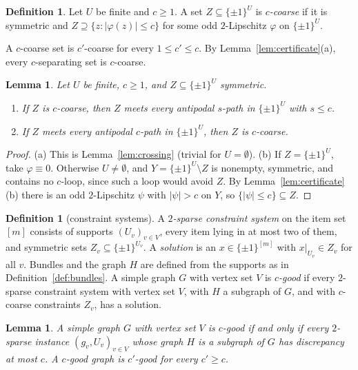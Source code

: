 \documentclass[11pt,letterpaper]{article}
\newtheorem{lemma}[theorem]{Lemma}
\theoremstyle{definition}
\newtheorem{definition}[theorem]{Definition}
\newcommand{\cube}[1]{\{\pm1\}^{#1}}
\begin{document}
\begin{definition}\label{def:coarse}
Let $U$ be finite and $c\ge1$. A set $Z\subseteq\cube U$ is \emph{$c$-coarse} if it is symmetric
and $Z\supseteq\{z:|\varphi(z)|\le c\}$ for some odd $2$-Lipschitz $\varphi$ on $\cube U$.
\end{definition}

A $c$-coarse set is $c'$-coarse for every $1\le c'\le c$. By Lemma~\ref{lem:certificate}(a), every
$c$-separating set is $c$-coarse.

\begin{lemma}\label{lem:coarse}
Let $U$ be finite, $c\ge1$, and $Z\subseteq\cube U$ symmetric.
\begin{enumerate}[label=(\alph*),itemsep=0pt]
\item If $Z$ is $c$-coarse, then $Z$ meets every antipodal $s$-path in $\cube U$ with $s\le c$.
\item If $Z$ meets every antipodal $c$-path in $\cube U$, then $Z$ is $c$-coarse.
\end{enumerate}
\end{lemma}

\begin{proof}
(a) This is Lemma~\ref{lem:crossing} (trivial for $U=\emptyset$).
(b) If $Z=\cube U$, take $\varphi\equiv0$. Otherwise $U\ne\emptyset$, and $Y=\cube U\setminus Z$ is
nonempty, symmetric, and contains no $c$-loop, since such a loop would avoid $Z$. By
Lemma~\ref{lem:certificate}(b) there is an odd $2$-Lipschitz $\psi$ with $|\psi|>c$ on $Y$, so
$\{|\psi|\le c\}\subseteq Z$.
\end{proof}

\begin{definition}[constraint systems]\label{def:constraints}
A \emph{$2$-sparse constraint system} on the item set $[m]$ consists of supports
$(U_v)_{v\in V}$, every item lying in at most two of them, and symmetric sets
$Z_v\subseteq\cube{U_v}$. A \emph{solution} is an $x\in\cube{[m]}$ with $x|_{U_v}\in Z_v$ for all
$v$. Bundles and the graph $H$ are defined from the supports as in Definition~\ref{def:bundles}. A
simple graph $G$ with vertex set $V$ is \emph{$c$-good} if every $2$-sparse constraint system with
vertex set $V$, with $H$ a subgraph of $G$, and with $c$-coarse constraints $Z_v$, has a solution.
\end{definition}

\begin{lemma}\label{lem:good}
A simple graph $G$ with vertex set $V$ is $c$-good if and only if every $2$-sparse instance
$(g_v,U_v)_{v\in V}$ whose graph $H$ is a subgraph of $G$ has discrepancy at most $c$. A $c$-good
graph is $c'$-good for every $c'\ge c$.
\end{lemma}
\end{document}
